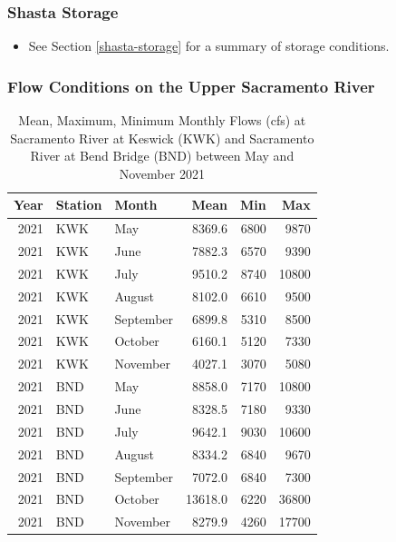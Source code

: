\documentclass[
]{book}
\providecommand{\tightlist}{%
  \setlength{\itemsep}{0pt}\setlength{\parskip}{0pt}}
\theoremstyle{definition}
\theoremstyle{definition}
\theoremstyle{definition}
\theoremstyle{definition}
\theoremstyle{remark}
\begin{document}
\hypertarget{shasta-storage-1}{%
\subsubsection{Shasta Storage}\label{shasta-storage-1}}

\begin{itemize}
\tightlist
\item
  See Section \ref{shasta-storage} for a summary of storage conditions.
\end{itemize}

\hypertarget{flow-conditions-on-the-upper-sacramento-river-1}{%
\subsubsection{Flow Conditions on the Upper Sacramento River}\label{flow-conditions-on-the-upper-sacramento-river-1}}

\begin{table}
\centering
\caption{Mean, Maximum, Minimum Monthly Flows (cfs) at Sacramento River at Keswick (KWK) and Sacramento River at Bend Bridge (BND) between May and November 2021}
\centering
\begin{tabular}[t]{rllrrr}
\hline
Year & Station & Month & Mean & Min & Max\\
\hline
2021 & KWK & May & 8369.6 & 6800 & 9870\\
\hline
2021 & KWK & June & 7882.3 & 6570 & 9390\\
\hline
2021 & KWK & July & 9510.2 & 8740 & 10800\\
\hline
2021 & KWK & August & 8102.0 & 6610 & 9500\\
\hline
2021 & KWK & September & 6899.8 & 5310 & 8500\\
\hline
2021 & KWK & October & 6160.1 & 5120 & 7330\\
\hline
2021 & KWK & November & 4027.1 & 3070 & 5080\\
\hline
2021 & BND & May & 8858.0 & 7170 & 10800\\
\hline
2021 & BND & June & 8328.5 & 7180 & 9330\\
\hline
2021 & BND & July & 9642.1 & 9030 & 10600\\
\hline
2021 & BND & August & 8334.2 & 6840 & 9670\\
\hline
2021 & BND & September & 7072.0 & 6840 & 7300\\
\hline
2021 & BND & October & 13618.0 & 6220 & 36800\\
\hline
2021 & BND & November & 8279.9 & 4260 & 17700\\
\hline
\end{tabular}
\end{table}
\end{document}
